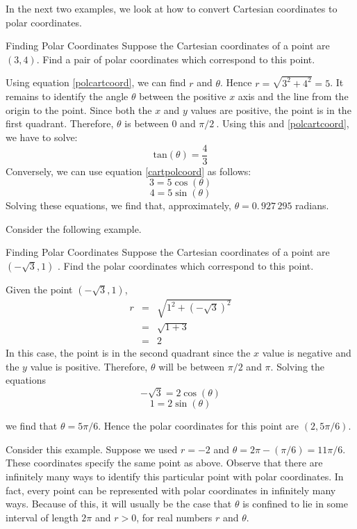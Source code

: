 In the next two examples, we look at how to convert Cartesian coordinates to polar coordinates. 

\begin{example}{Finding Polar Coordinates}
Suppose the Cartesian coordinates of a point are $\left( 3,4\right) $. Find
a pair of polar coordinates which correspond to this point.
\end{example}

\begin{solution}
Using equation \ref{polcartcoord}, we can find $r$ and $\theta$. Hence $r=\sqrt{3^{2}+4^{2}}=5$. It remains to identify the angle $\theta$ between the positive $x$ axis and the line from the origin to the point. Since both the $x$ and $y$ values are positive, the point is in the
first quadrant. Therefore, $\theta$ is between $0$ and $\pi /2\ $. 
Using this and \ref{polcartcoord}, we have to solve:
\[
\mbox{tan}\left(\theta \right)=\frac{4}{3}
\]
Conversely, we can use equation \ref{cartpolcoord} as follows:
\[
3=5\cos \left( \theta \right) 
\]
\[
4 = 5\sin \left( \theta \right) 
\]
Solving these equations, we find that, 
approximately, $\theta =0.\, 927\,295$ radians.
\end{solution}

Consider the following example.

\begin{example}{Finding Polar Coordinates}
Suppose the Cartesian coordinates of a point are $\left( -\sqrt{3},1\right)$
. Find the polar coordinates which correspond to this point.
\end{example}

\begin{solution}
Given the point $\left( -\sqrt{3}, 1\right)$, 
\begin{eqnarray*}
r &=& \sqrt{ 1^2 + (-\sqrt{3})^2}\\
&=& \sqrt{1 + 3}\\
&=&2
\end{eqnarray*}
 In this case, the point is in the second quadrant since the $x$ value is negative and the $y$ value is positive. Therefore, $\theta$ will be between $\pi/2$ and $\pi$.
Solving the equations
\[
-\sqrt{3}= 2 \cos \left(\theta\right)
\]
\[
1 = 2 \sin \left( \theta\right) 
\]

we find that $\theta = 5\pi /6.$
Hence the polar coordinates for this point are $\left(2, 5\pi /6 \right)$.
\end{solution}

Consider this example. Suppose we used $r=-2$ and $\theta =2\pi -\left( \pi /6\right) = 11\pi /6 $. These coordinates specify the same point as above. Observe that there are infinitely many ways to identify this
particular point with polar coordinates. In fact, every point can be represented with polar coordinates in infinitely many ways. Because of this, it will usually be
the case that $\theta $ is confined to lie in some interval
of length $2\pi $ and $r>0$, for real numbers $r$ and $\theta $. 

